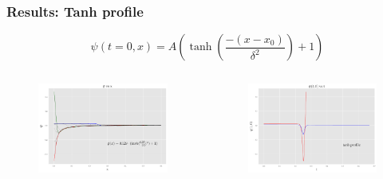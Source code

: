 \documentclass[hyperref={bookmarks=false},aspectratio=169]{beamer}
\begin{document}
\begin{frame}
    \frametitle{Results: Tanh profile}

    \begin{equation*}
        \psi(t=0, x)=A\left(\tanh \left(\frac{-\left(x-x_{0}\right)}{\delta^{2}}\right)+1\right)
    \end{equation*}

    \begin{columns}
        \begin{figure}
            \centering
            \includegraphics[width=1\linewidth]{images/super_tanh.pdf}
        \end{figure}
        \begin{figure}
            \centering
            \includegraphics[width=1\linewidth]{images/at0_tanh.pdf}
        \end{figure}
    \end{columns}

\end{frame}
\end{document}
